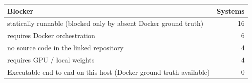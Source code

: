 \begin{tabular}{lr}
\toprule
Blocker & Systems \\
\midrule
statically runnable (blocked only by absent Docker ground truth) & 16 \\
requires Docker orchestration & 6 \\
no source code in the linked repository & 4 \\
requires GPU / local weights & 4 \\
\midrule Executable end-to-end on this host (Docker ground truth available) & 0 \\
\bottomrule
\end{tabular}
